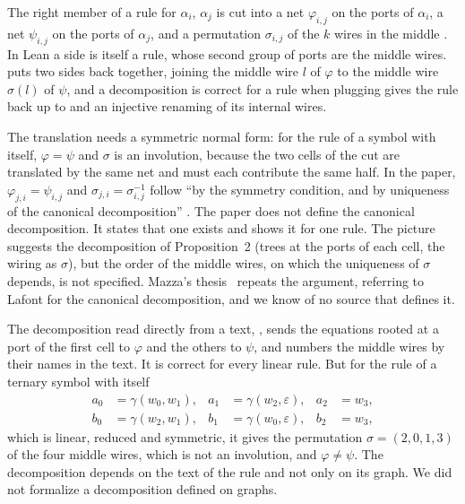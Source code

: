 \documentclass[11pt,a4paper]{article}
\newcommand{\Equiv}{\cod{Equiv}}
\newcommand{\pp}[1]{\cite[#1]{lafont1997}}
\begin{document}
The right member of a rule for $\alpha_i$, $\alpha_j$ is cut into a net $\varphi_{i,j}$ on the
ports of $\alpha_i$, a net $\psi_{i,j}$ on the ports of $\alpha_j$, and a permutation
$\sigma_{i,j}$ of the $k$ wires in the middle \pp{p.~85}. In Lean a side is itself a rule,
whose second group of ports are the middle wires.  puts two sides back together,
joining the middle wire $l$ of $\varphi$ to the middle wire $\sigma(l)$ of $\psi$, and a
decomposition is correct for a rule when plugging gives the rule back up to \Equiv{} and an
injective renaming of its internal wires.

The translation needs a symmetric normal form: for the rule of a symbol with itself, $\varphi =
\psi$ and $\sigma$ is an involution, because the two cells of the cut are translated by
the same net and must each contribute the same half. In the paper, $\varphi_{j,i} =
\psi_{i,j}$ and $\sigma_{j,i} = \sigma_{i,j}^{-1}$ follow ``by the symmetry condition, and by
uniqueness of the canonical decomposition'' \pp{p.~85}. The paper does not define the
canonical decomposition. It states that one exists and shows it for one rule. The picture
suggests the decomposition of Proposition~2 (trees at the ports of each cell, the wiring as
$\sigma$), but the order of the middle wires, on which the uniqueness of $\sigma$ depends, is
not specified. Mazza's thesis~\cite{mazza2006} repeats the argument, referring to Lafont for the
canonical decomposition, and we know of no source that defines it.

The decomposition read directly from a text, ,
sends the equations rooted at a port of the first cell to $\varphi$ and the others to $\psi$,
and numbers the middle wires by their names in the text. It is correct for every linear rule.
But for the rule of a ternary symbol with itself
\begin{align*}
  a_0 &= \gamma(w_0, w_1), & a_1 &= \gamma(w_2, \varepsilon), & a_2 &= w_3,\\
  b_0 &= \gamma(w_2, w_1), & b_1 &= \gamma(w_0, \varepsilon), & b_2 &= w_3,
\end{align*}
which is linear, reduced and symmetric, it gives the permutation $\sigma = (2, 0, 1, 3)$ of the
four middle wires, which is not an involution, and $\varphi \neq \psi$. The decomposition
depends on the text of the rule and not only on its graph. We did not formalize a decomposition
defined on graphs.
\end{document}
